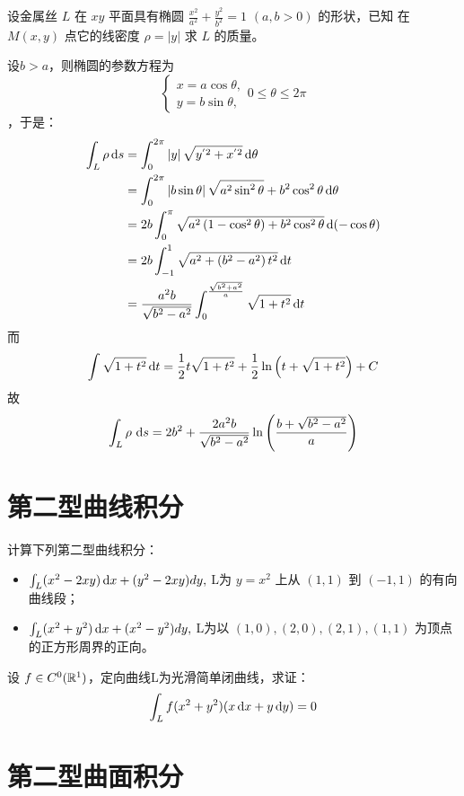 \begin{problem}
    设金属丝 \(L\) 在 \(xy\) 平面具有椭圆 \(\frac{x^2}{a^2} + \frac{y^2}{b^2} =
    1\) \((a, b > 0)\) 的形状，已知
    在 \(M(x, y)\) 点它的线密度 \(\rho = |y|\) 求 \(L\) 的质量。
\end{problem}

\begin{solution}
    设\(b>a\)，则椭圆的参数方程为 \[
        \begin{cases}
            x = a\cos\theta, \\
            y = b\sin\theta,
        \end{cases} 0\leq\theta\leq2\pi
    \]，于是：
    \begin{align*}
        \int_{L} \rho \operatorname{d}\!{s} &= \int_{0}^{2\pi} \left| y \right|
        \sqrt{y^{'2}+x^{'2}} \operatorname{d}\!{\theta}\\
        &=\int_{0}^{2\pi} \left| b\sin\theta \right|
        \sqrt{a^{2}\sin^{2}\theta}+b^{2}\cos^{2}\theta
        \operatorname{d}\!{\theta} \\
        &= 2b  \int_{0}^{\pi} \sqrt{a^{2}\left( 1-\cos^{2}\theta
        \right) + b^{2}\cos^{2}\theta } \operatorname{d}\!{(-\cos\theta)} \\
        &= 2b \int_{-1}^{1} \sqrt{a^{2}+\left( b^{2}-a^{2}
        \right)t^{2}} \operatorname{d}\!{t}\\
        &= \frac{a^{2}b}{\sqrt{b^{2}-a^{2}}}
        \int_{0}^{\frac{\sqrt{b^{2}+a^{2}}}{a}}
        \sqrt{1+t^{2}} \operatorname{d}\!{t}
    \end{align*}
    而\[
        \int \sqrt{1+t^{2}} \operatorname{d}\!{t} = \frac{1}{2}t\sqrt{1+t^{2}} +
        \frac{1}{2}\ln\left( t+\sqrt{1+t^{2}} \right) + C
    \]
    故\[
        \int_{L} \rho \, \operatorname{d}\!{s} =
        2b^{2}+\frac{2a^{2}b}{\sqrt{b^{2}-a^{2}}}\ln\left(
        \frac{b+\sqrt{b^{2}-a^{2}}}{a} \right)
    \]
\end{solution}
\section{第二型曲线积分}
\begin{problem}
    计算下列第二型曲线积分：
    \begin{itemize}
        \item \(\int_L (x^2 - 2xy) \operatorname{d}\!{x} + (y^2 -
            2xy) dy, \) L为 \(y =
            x^2\) 上从 \((1, 1)\) 到 \((-1, 1)\) 的有向曲线段；
        \item \( \int_L (x^2 + y^2) \operatorname{d}\!{x} + (x^2 -
            y^2) dy, \) L为以 \((1, 0), (2, 0), (2, 1),
            (1, 1)\) 为顶点的正方形周界的正向。
    \end{itemize}
\end{problem}

\begin{problem}
    设 \(f \in C^0(\mathbb{R}^1)\)，定向曲线L为光滑简单闭曲线，求证：
    \[
        \int_L f(x^2 + y^2)(x \operatorname{d}\!{x} + y \operatorname{d}\!{y}) = 0
    \]
\end{problem}

\section{第二型曲面积分}
